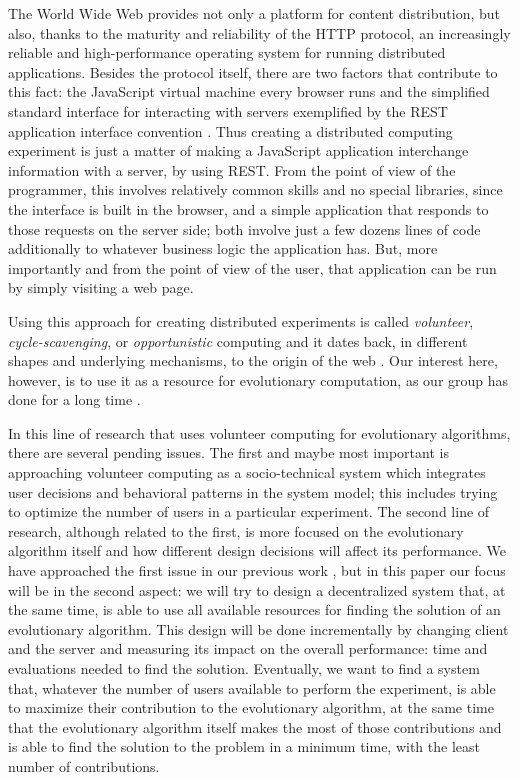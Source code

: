 \documentclass[runningheads,a4paper]{llncs}\usepackage[]{graphicx}\usepackage[]{color}
\begin{document}
The World Wide Web provides not only a platform for content
distribution, but also, thanks to the maturity and reliability of the
HTTP protocol, an increasingly reliable and high-performance
operating system for running distributed applications. Besides the
protocol itself, there are two factors that contribute to this fact:
the JavaScript virtual machine every browser runs \cite{paulson2005building}
and the simplified standard interface for interacting with servers
exemplified by the REST application interface convention \cite{masse2011rest}.
Thus creating a distributed computing experiment is just a matter of
making a JavaScript application interchange information with a server,
by using REST. From the point of view of the programmer, this involves
relatively common skills and no special libraries, since the
interface is built in the browser, and a simple application that
responds to those requests on the server side; both involve just a few
dozens lines of code additionally to whatever business logic the
application has. But, more importantly and from the point of view of
the user, that application can be run by simply visiting a web page.

Using this approach for creating distributed experiments is called {\em
  volunteer}, {\em cycle-scavenging}, or {\em opportunistic} computing
\cite{sarmenta2001volunteer} and it dates back, in different shapes
and underlying mechanisms, to the origin of the web \cite{david-seti:home}. Our interest
here, however, is to use it as a resource for evolutionary
computation, as our group has done for a long time \cite{jj-ppsn98anonymous}.

In this line of research that uses volunteer computing for
evolutionary algorithms, there are several pending issues. The first
and maybe most important is approaching volunteer computing as a
socio-technical system \cite{vespignani2009predicting} which integrates
user decisions and behavioral patterns in the system model; this
includes trying to optimize the number of users in a particular
experiment. The second line of research, although related to the
first, is more focused on the evolutionary algorithm itself and how
different design decisions will affect its performance.
We have approached the first issue in our previous work \cite{jj-ppsn98anonymous},
but in this paper our focus will be in the second aspect: we will try to
design a decentralized system that, at the same time, is able to use
all available resources for finding the solution of an evolutionary algorithm. This design will be done incrementally by
changing client and the server and measuring its
impact on the overall performance: time and evaluations needed to find
the solution. Eventually, we want to find a system that, whatever the
number of users available to perform the experiment, is able to
maximize their contribution to the evolutionary algorithm, at the same
time that the evolutionary algorithm itself makes the most of those
contributions and is able to find
the solution to the problem in a minimum time, with the least
number of contributions.
\end{document}
